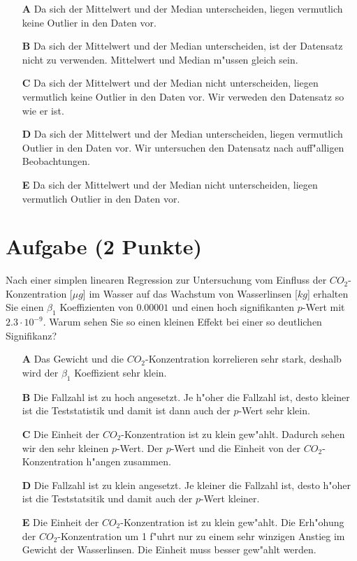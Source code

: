\documentclass[a4paper, 10pt]{scrartcl}\usepackage[]{graphicx}\usepackage[]{xcolor}
\begin{document}
\begin{enumerate}
\item [\textbf{A} \msquare] Da sich der Mittelwert und der Median unterscheiden, liegen vermutlich keine Outlier in den Daten vor.
\item [\textbf{B} \msquare] Da sich der Mittelwert und der Median unterscheiden, ist der Datensatz nicht zu verwenden. Mittelwert und Median m{"u}ssen gleich sein.
\item [\textbf{C} \msquare] Da sich der Mittelwert und der Median nicht unterscheiden, liegen vermutlich keine Outlier in den Daten vor. Wir verweden den Datensatz so wie er ist.
\item [\textbf{D} \msquare] Da sich der Mittelwert und der Median unterscheiden, liegen vermutlich Outlier in den Daten vor. Wir untersuchen den Datensatz nach auff{"a}lligen Beobachtungen.
\item [\textbf{E} \msquare] Da sich der Mittelwert und der Median nicht unterscheiden, liegen vermutlich Outlier in den Daten vor.
\end{enumerate} 

\section{Aufgabe \hfill (2 Punkte)}

Nach einer simplen linearen Regression zur Untersuchung vom Einfluss der
$CO_2$-Konzentration [$\mu g$] im Wasser auf das Wachstum von Wasserlinsen
[$kg$] erhalten Sie einen $\beta_1$ Koeffizienten von $0.00001$ und einen
hoch signifikanten $p$-Wert mit $2.3\cdot 10^{-9}$. Warum sehen Sie so einen kleinen
Effekt bei einer so deutlichen Signifikanz? 




\begin{enumerate}
\item [\textbf{A} \msquare] Das Gewicht und die $CO_2$-Konzentration korrelieren sehr stark, deshalb wird der $\beta_1$ Koeffizient sehr klein.
\item [\textbf{B} \msquare] Die Fallzahl ist zu hoch angesetzt. Je h{"o}her die Fallzahl ist, desto kleiner ist die Teststatistik und damit ist dann auch der $p$-Wert sehr klein.
\item [\textbf{C} \msquare] Die Einheit der $CO_2$-Konzentration ist zu klein gew{"a}hlt. Dadurch sehen wir den sehr kleinen $p$-Wert. Der $p$-Wert und die Einheit von der $CO_2$-Konzentration h{"a}ngen zusammen.
\item [\textbf{D} \msquare] Die Fallzahl ist zu klein angesetzt. Je kleiner die Fallzahl ist, desto h{"o}her ist die Teststatsitik und damit auch der $p$-Wert kleiner. 
\item [\textbf{E} \msquare] Die Einheit der $CO_2$-Konzentration ist zu klein gew{"a}hlt. Die Erh{"o}hung der $CO_2$-Konzentration um 1 f{"u}hrt nur zu einem sehr winzigen Anstieg im Gewicht der Wasserlinsen. Die Einheit muss besser gew{"a}hlt werden.
\end{enumerate} 
\end{document}
